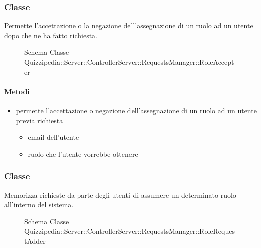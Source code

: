 \subsubsection{Classe }
Permette l'accettazione o la negazione dell'assegnazione di un ruolo ad un utente dopo che ne ha fatto richiesta.
\begin{figure}[H]
\centering
\noindent{}
\caption[Schema Classe RoleAccepter]{Schema Classe Quizzipedia::Server::ControllerServer::RequestsManager::RoleAccepter}
\end{figure}
\paragraph{Metodi}
\begin{itemize}
\item {}
\newline
permette l'accettazione o negazione dell'assegnazione di un ruolo ad un utente previa richiesta
\newline
{}
\newline
\begin{itemize}
\item {}
\newline
email dell'utente
\item {}
\newline
ruolo che l'utente vorrebbe ottenere
\end{itemize}
\end{itemize}
\subsubsection{Classe }
Memorizza richieste da parte degli utenti di assumere un determinato ruolo all'interno del sistema.
\begin{figure}[H]
\centering
\noindent{}
\caption[Schema Classe RoleRequestAdder]{Schema Classe Quizzipedia::Server::ControllerServer::RequestsManager::RoleRequestAdder}
\end{figure}
